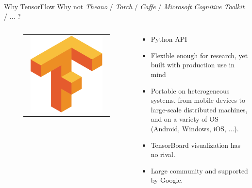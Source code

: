 \documentclass[aspectratio=169]{beamer}
\begin{document}
\begin{frame}{Why TensorFlow}
Why not \textit{Theano} / \textit{Torch} / \textit{Caffe} / \textit{Microsoft Cognitive Toolkit} / $\dots$ ?\\
\vspace{0.5cm}
\begin{columns}
\begin{column}{0.3\textwidth}
\begin{figure}
\begin{tabular}{c}
	\includegraphics[width=0.9\textwidth]{img/tf/tf_logo.png}
\end{tabular}
\end{figure}
\end{column}
\begin{column}{0.7\textwidth}
	\begin{itemize}
	\item Python API
	\item Flexible enough for research, yet built with production use in mind
	\item Portable on heterogeneous systems, from mobile devices to large-scale distributed machines, and on a variety of OS (Android, Windows, iOS, ...).
	\item TensorBoard visualization has no rival.
	\item Large community and supported by Google.
	\end{itemize}
\end{column}
\end{columns}
\end{frame}
\end{document}
